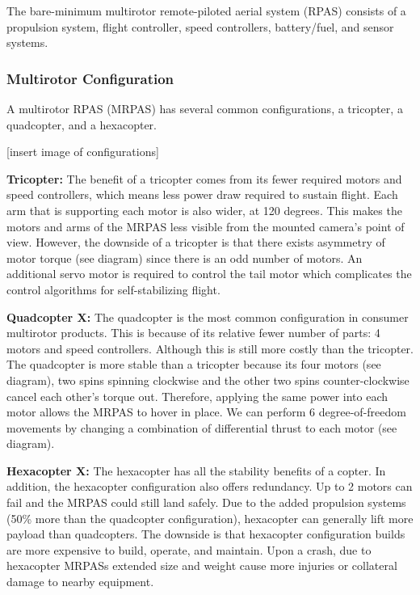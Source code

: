 The bare-minimum multirotor remote-piloted aerial system (RPAS) consists of a propulsion system, flight controller, speed controllers, battery/fuel, and sensor systems.

\subsubsection{Multirotor Configuration}

A multirotor RPAS (MRPAS) has several common configurations, a tricopter, a quadcopter, and a hexacopter.

[insert image of configurations]

\textbf{Tricopter: }The benefit of a tricopter comes from its fewer required motors and speed controllers, 
which means less power draw required to sustain flight. Each arm that is supporting each motor is also wider, at 120 
degrees. This makes the motors and arms of the MRPAS less visible from the mounted camera's point of view. 
However, the downside of a tricopter is that there exists asymmetry of motor torque (see diagram) since 
there is an odd number of motors. An additional servo motor is required to control the tail motor which 
complicates the control algorithms for self-stabilizing flight.

\textbf{Quadcopter X: }
The quadcopter is the most common configuration in consumer multirotor products. This is because of its relative fewer 
number of parts: 4 motors and speed controllers. Although this is still more costly than the tricopter. The 
quadcopter is more stable than a tricopter because its four motors (see diagram), two spins spinning 
clockwise and the other two spins counter-clockwise cancel each other’s torque out. Therefore, applying the 
same power into each motor allows the MRPAS to hover in place. We can perform 6 degree-of-freedom movements 
by changing a combination of differential thrust to each motor (see diagram).

\textbf{Hexacopter X: }
The hexacopter has all the stability benefits of a copter. In addition, the hexacopter configuration also 
offers redundancy. Up to 2 motors can fail and the MRPAS could still land safely. Due to the added 
propulsion systems (50\% more than the quadcopter configuration), hexacopter can generally lift more 
payload than quadcopters. The downside is that hexacopter configuration builds are more expensive to build, 
operate, and maintain. Upon a crash, due to hexacopter MRPASs extended size and weight cause more injuries 
or collateral damage to nearby equipment.


